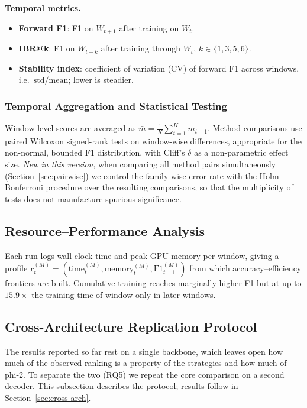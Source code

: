 \documentclass[a4paper,twoside]{article}
\begin{document}
\textbf{Temporal metrics.}
\begin{itemize}
    \item \textbf{Forward F1}: F1 on $W_{t+1}$ after training on $W_t$.
    \item \textbf{IBR@k}: F1 on $W_{t-k}$ after training through $W_t$, $k\in\{1,3,5,6\}$.
    \item \textbf{Stability index}: coefficient of variation (CV) of forward F1 across windows, i.e.\ $\mathrm{std}/\mathrm{mean}$; lower is steadier.
\end{itemize}

\subsubsection{Temporal Aggregation and Statistical Testing}
\label{sec:statistics}

\noindent
Window-level scores are averaged as $\bar{m} = \frac{1}{K}\sum_{t=1}^{K} m_{t+1}$. Method comparisons use paired Wilcoxon signed-rank tests on window-wise differences, appropriate for the non-normal, bounded F1 distribution, with Cliff's $\delta$ as a non-parametric effect size. \emph{New in this version}, when comparing all method pairs simultaneously (Section~\ref{sec:pairwise}) we control the family-wise error rate with the Holm--Bonferroni procedure over the resulting comparisons, so that the multiplicity of tests does not manufacture spurious significance.

\subsection{Resource--Performance Analysis}
\label{sec:resource-analysis}

\noindent
Each run logs wall-clock time and peak GPU memory per window, giving a profile $\mathbf{r}_{t}^{(M)} = (\text{time}_t^{(M)}, \text{memory}_t^{(M)}, \mathrm{F1}_{t+1}^{(M)})$ from which accuracy--efficiency frontiers are built. Cumulative training reaches marginally higher F1 but at up to $15.9\times$ the training time of window-only in later windows.

\subsection{Cross-Architecture Replication Protocol}
\label{sec:replication}

\noindent
The results reported so far rest on a single backbone, which leaves open how much of the observed ranking is a property of the strategies and how much of phi-2. To separate the two (RQ5) we repeat the core comparison on a second decoder. This subsection describes the protocol; results follow in Section~\ref{sec:cross-arch}.
\end{document}
